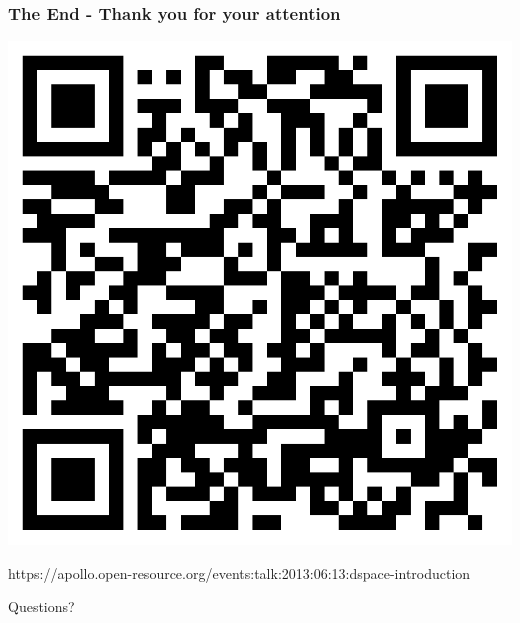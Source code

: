 \documentclass{beamer}
\begin{document}
{
\begin{frame}[plain]
\frametitle{\vspace{-2.40ex}The End - Thank you for your attention}
  \vspace{3ex}
  \includegraphics[scale=0.16]{images/qrcode.png}
  \linebreak
  \begin{tiny}https://apollo.open-resource.org/events:talk:2013:06:13:dspace-introduction\end{tiny}
  \vspace{1ex}

  Questions?
\end{frame}
}
\end{document}
